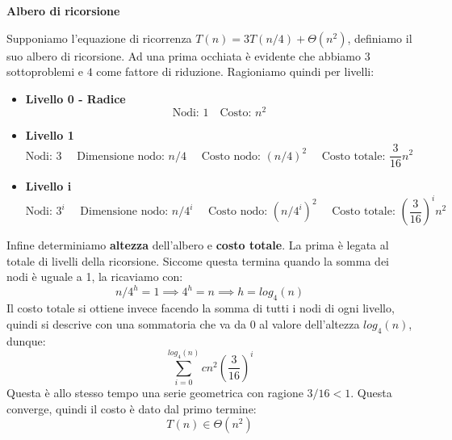 \begin{esempio}
	\textbf{Albero di ricorsione}\par
	\noindent Supponiamo l'equazione di ricorrenza $T(n) = 3T(n/4) + \Theta(n^2)$, definiamo il suo albero di ricorsione. Ad una prima occhiata è evidente che abbiamo $3$ sottoproblemi e $4$ come fattore di riduzione. Ragioniamo quindi per livelli: \begin{itemize}
		\item \textbf{Livello 0 - Radice} \[\text{Nodi: }1\quad \text{Costo: }n^2\]
		\item \textbf{Livello 1} \[\text{Nodi: }3\quad\text{ Dimensione nodo: }n/4\quad\text{ Costo nodo: }(n/4)^2\quad \text{ Costo totale: }\frac{3}{16}n^2\]
		\item \textbf{Livello i} \[\text{Nodi: }3^i\quad\text{ Dimensione nodo: }n/4^i\quad\text{ Costo nodo: }(n/4^i)^2\quad \text{ Costo totale: }\left(\frac{3}{16}\right)^in^2\]
	\end{itemize}
	\noindent Infine determiniamo \textbf{altezza} dell'albero e \textbf{costo totale}. La prima è legata al totale di livelli della ricorsione. Siccome questa termina quando la somma dei nodi è uguale a 1, la ricaviamo con: \[n/4^h = 1 \implies 4^h = n \implies h = log_4(n)\]
	\noindent Il costo totale si ottiene invece facendo la somma di tutti i nodi di ogni livello, quindi si descrive con una sommatoria che va da $0$ al valore dell'altezza $log_4(n)$, dunque: \[\sum_{i=0}^{log_4(n)}cn^2\left(\frac{3}{16}\right)^i\]
	\noindent Questa è allo stesso tempo una serie geometrica con ragione $3/16 < 1$. Questa converge, quindi il costo è dato dal primo termine: \[T(n) \in \Theta(n^2)\]
	\begin{center}
	\end{center}
\end{esempio}
